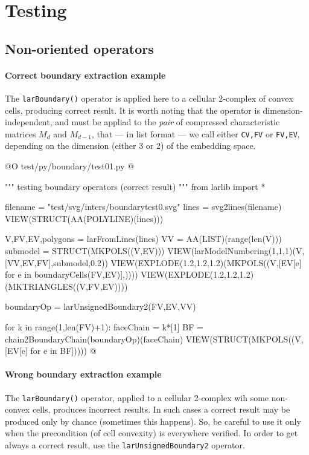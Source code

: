 \documentclass[11pt,oneside]{article}    %
\begin{document}
\section{Testing}

\subsection{Non-oriented operators}

\paragraph{Correct boundary extraction example}

The \texttt{larBoundary()} operator is applied here to a cellular 2-complex of convex cells, producing correct result. It is worth noting that the operator is dimension-independent, and must be appliad to the \emph{pair} of compressed characteristic matrices $M_d$ and $M_{d-1}$, that --- in list format --- we call either \texttt{CV,FV} or  \texttt{FV,EV}, depending on the dimension (either 3 or 2) of the embedding space.

@O test/py/boundary/test01.py
@{""" testing boundary operators (correct result) """
from larlib import *

filename = "test/svg/inters/boundarytest0.svg"
lines = svg2lines(filename)
VIEW(STRUCT(AA(POLYLINE)(lines)))
    
V,FV,EV,polygons = larFromLines(lines)
VV = AA(LIST)(range(len(V)))
submodel = STRUCT(MKPOLS((V,EV)))
VIEW(larModelNumbering(1,1,1)(V,[VV,EV,FV],submodel,0.2))
VIEW(EXPLODE(1.2,1.2,1.2)(MKPOLS((V,[EV[e] for e in boundaryCells(FV,EV)],))))
VIEW(EXPLODE(1.2,1.2,1.2)(MKTRIANGLES((V,FV,EV))))

boundaryOp = larUnsignedBoundary2(FV,EV,VV)

for k in range(1,len(FV)+1):
    faceChain = k*[1]
    BF = chain2BoundaryChain(boundaryOp)(faceChain)
    VIEW(STRUCT(MKPOLS((V,[EV[e] for e in BF]))))
@}

\paragraph{Wrong boundary extraction example}

The \texttt{larBoundary()} operator, applied  to a cellular 2-complex wih some non-convex cells, produces incorrect results. In such cases a correct result may be produced only by chance (sometimes this happens). So, be careful to use it only when the precondition (of cell convexity) is everywhere verified. In order to get always a correct result, use the \texttt{larUnsignedBoundary2} operator.
\end{document}

